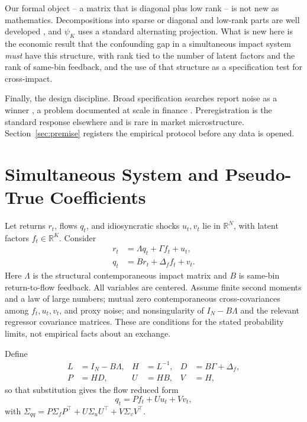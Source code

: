 \documentclass[10pt,twocolumn]{article}
\theoremstyle{remark}
\newcommand{\R}{\mathbb{R}}
\begin{document}
Our formal object -- a matrix that is diagonal plus low rank -- is not new as
mathematics. Decompositions into sparse or diagonal and low-rank parts are
well developed \cite{ChandrasekaranEtAl2011,ChandrasekaranParriloWillsky2012,CandesRecht2009},
and $\psi_K$ uses a standard alternating projection. What is new here is the
economic result that the confounding gap in a simultaneous impact system
\emph{must} have this structure, with rank tied to the number of latent factors
and the rank of same-bin feedback, and the use of that structure as a
specification test for cross-impact.

Finally, the design discipline. Broad specification searches report noise as a
winner \cite{White2000,Hansen2005,RomanoWolf2005}, a problem documented at
scale in finance \cite{HarveyLiuZhu2016,Harvey2017,BailyLopezDePrado2014}.
Preregistration is the standard response elsewhere \cite{NosekEtAl2018} and is
rare in market microstructure. Section~\ref{sec:premise} registers the
empirical protocol before any data is opened.

\section{Simultaneous System and Pseudo-True Coefficients}

Let returns $r_t$, flows $q_t$, and idiosyncratic shocks $u_t,v_t$ lie in
$\R^N$, with latent factors $f_t\in\R^K$. Consider
\begin{align}
r_t &= \Lambda q_t + \Gamma f_t + u_t, \label{eq:return}\\
q_t &= B r_t + \Delta_f f_t + v_t. \label{eq:flow}
\end{align}
Here $\Lambda$ is the structural contemporaneous impact matrix and $B$ is
same-bin return-to-flow feedback. All variables are centered. Assume finite
second moments and a law of large numbers; mutual zero contemporaneous
cross-covariances among $f_t,u_t,v_t$, and proxy noise; and nonsingularity of
$I_N-B\Lambda$ and the relevant regressor covariance matrices. These are
conditions for the stated probability limits, not empirical facts about an
exchange.

Define
\begin{align}
L &= I_N-B\Lambda, & H &= L^{-1}, & D &= B\Gamma+\Delta_f, \\
P &= HD, & U &= HB, & V &= H,
\end{align}
so that substitution gives the flow reduced form
\begin{equation}
q_t=P f_t+Uu_t+Vv_t, \label{eq:q-reduced}
\end{equation}
with $\Sigma_{qq}=P\Sigma_fP^\top+U\Sigma_uU^\top+V\Sigma_vV^\top$.
\end{document}
